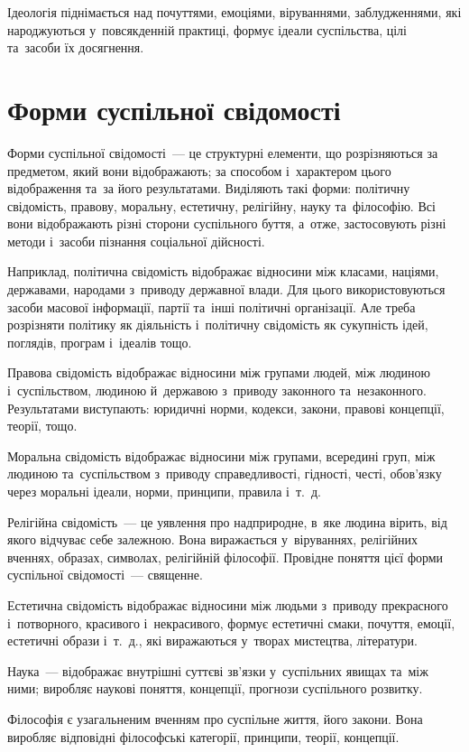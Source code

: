 \documentclass[a5paper,oneside,DIV=12,12pt,headings=small]{scrartcl}
\begin{document}
		Ідеологія піднімається над почуттями, емоціями, віруваннями, заблудженнями, які народжуються у~повсякденній практиці, формує ідеали суспільства, цілі та~засоби їх досягнення.


\section{Форми суспільної свідомості}
		Форми суспільної свідомості~— це структурні елементи, що розрізняються за предметом, який вони відображають; за способом і~характером цього відображення та~за його результатами. Виділяють  такі форми: політичну свідомість, правову, моральну, естетичну, релігійну, науку та~філософію. Всі вони відображають різні сторони суспільного буття, а~отже, застосовують  різні методи і~засоби пізнання соціальної дійсності.
		
		Наприклад, політична свідомість відображає відносини між класами, націями, державами, народами з~приводу державної влади. Для цього використовуються засоби масової інформації, партії та~інші політичні організації. Але треба розрізняти політику як діяльність і~політичну свідомість як сукупність ідей, поглядів, програм і~ідеалів тощо.
		
		Правова свідомість відображає відносини між групами людей, між людиною і~суспільством, людиною й~державою з~приводу законного та~незаконного. Результатами виступають: юридичні норми, кодекси, закони, правові концепції, теорії, тощо.
		
		Моральна свідомість відображає відносини між групами, всередині груп, між людиною та~суспільством з~приводу справедливості, гідності, честі, обов'язку через моральні ідеали, норми, принципи, правила і~т.~д.
		
		Релігійна свідомість~— це уявлення про надприродне, в~яке людина вірить, від якого відчуває себе залежною. Вона виражається у~віруваннях, релігійних  вченнях, образах, символах, релігійній філософії. Провідне поняття цієї форми суспільної свідомості~— священне.
		
		Естетична свідомість відображає відносини між людьми з~приводу прекрасного і~потворного, красивого і~некрасивого, формує естетичні смаки, почуття, емоції, естетичні образи і~т.~д., які  виражаються у~творах мистецтва, літератури.
		
		Наука~— відображає внутрішні суттєві зв'язки у~суспільних явищах та~між ними; виробляє наукові поняття, концепції, прогнози суспільного розвитку.
		
		Філософія є узагальненим вченням про суспільне життя, його закони. Вона виробляє відповідні філософські категорії, принципи, теорії, концепції.
		
\end{document}
